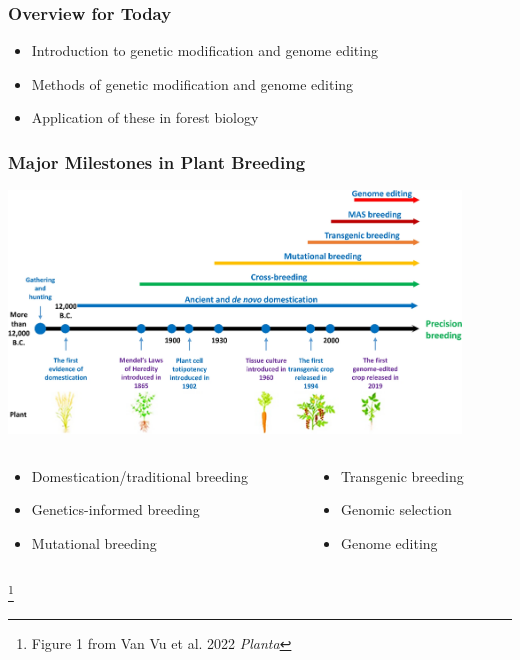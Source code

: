\documentclass[xcolor=dvipsnames]{beamer}
\newcommand\blfootnote[1]{%
	\begingroup
	\renewcommand\thefootnote{}\footnote{#1}%
	\addtocounter{footnote}{-1}%
	\endgroup
}
\begin{document}
\begin{frame}
	\frametitle{Overview for Today}
	\begin{itemize}
		\item[--] Introduction to genetic modification and genome editing
		\item[--] Methods of genetic modification and genome editing
		\item[--] Application of these in forest biology
	\end{itemize}
\end{frame}

\begin{frame}
	\frametitle{Major Milestones in Plant Breeding}
\centering	\includegraphics[keepaspectratio, width  = 0.9\textwidth]{img/timeLine}
	
	
	\begin{columns}
		\begin{column}{0.5\textwidth}
		\begin{itemize}
		\item[\textbf{1}] Domestication/traditional breeding
		\item[\textbf{2}] Genetics-informed breeding
		\item[\textbf{3}] Mutational breeding
		\end{itemize}
		\end{column}
		\begin{column}{0.5\textwidth}
		\begin{itemize}
		\item[\textbf{4}] Transgenic breeding
		\item[\textbf{5}] Genomic selection
		\item[\textbf{6}] Genome editing
		\end{itemize}
		\end{column}
	\end{columns}
	
\blfootnote{Figure 1 from Van Vu et al. 2022 \textit{Planta}}
	
	

\end{frame}
\end{document}
